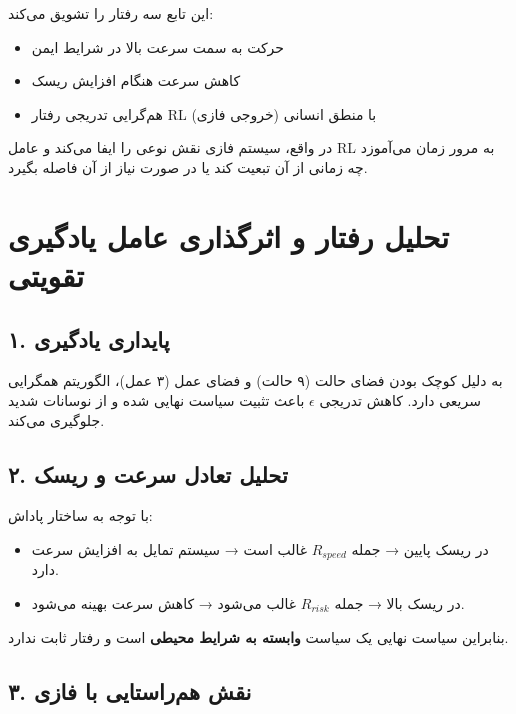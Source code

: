 \documentclass[a4paper, 10pt, twocolumn]{article}
\begin{document}
	این تابع سه رفتار را تشویق می‌کند:
	
	\begin{itemize}
		\item حرکت به سمت سرعت بالا در شرایط ایمن
		\item کاهش سرعت هنگام افزایش ریسک
		\item هم‌گرایی تدریجی رفتار RL با منطق انسانی (خروجی فازی)
	\end{itemize}
	
	در واقع، سیستم فازی نقش نوعی  را ایفا می‌کند و عامل RL به مرور زمان می‌آموزد چه زمانی از آن تبعیت کند یا در صورت نیاز از آن فاصله بگیرد.
	
	\vspace{1em}
	
	\section{تحلیل رفتار و اثرگذاری عامل یادگیری تقویتی}
	
	\subsection{۱. پایداری یادگیری}
	
	به دلیل کوچک بودن فضای حالت (۹ حالت) و فضای عمل (۳ عمل)، الگوریتم  همگرایی سریعی دارد.  
	کاهش تدریجی $\epsilon$ باعث تثبیت سیاست نهایی شده و از نوسانات شدید جلوگیری می‌کند.
	
	\vspace{1em}
	
	\subsection{۲. تحلیل تعادل سرعت و ریسک}
	
	با توجه به ساختار پاداش:
	
	\begin{itemize}
		\item در ریسک پایین → جمله $R_{speed}$ غالب است → سیستم تمایل به افزایش سرعت دارد.
		\item در ریسک بالا → جمله $R_{risk}$ غالب می‌شود → کاهش سرعت بهینه می‌شود.
	\end{itemize}
	
	بنابراین سیاست نهایی یک سیاست \textbf{وابسته به شرایط محیطی} است و رفتار ثابت ندارد.
	
	\vspace{1em}
	
	\subsection{۳. نقش هم‌راستایی با فازی}
	
\end{document}
